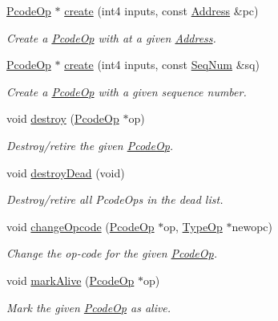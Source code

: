 \begin{DoxyCompactItemize}
\mbox{\hyperlink{class_pcode_op}{Pcode\+Op}} $\ast$ \mbox{\hyperlink{class_pcode_op_bank_a99a5d552174bddb89036c1755708b9aa}{create}} (int4 inputs, const \mbox{\hyperlink{class_address}{Address}} \&pc)
\begin{DoxyCompactList}\small\item\em Create a \mbox{\hyperlink{class_pcode_op}{Pcode\+Op}} with at a given \mbox{\hyperlink{class_address}{Address}}. \end{DoxyCompactList}\item 
\mbox{\hyperlink{class_pcode_op}{Pcode\+Op}} $\ast$ \mbox{\hyperlink{class_pcode_op_bank_a472c7fb8eea24665358e78977bc73245}{create}} (int4 inputs, const \mbox{\hyperlink{class_seq_num}{Seq\+Num}} \&sq)
\begin{DoxyCompactList}\small\item\em Create a \mbox{\hyperlink{class_pcode_op}{Pcode\+Op}} with a given sequence number. \end{DoxyCompactList}\item 
void \mbox{\hyperlink{class_pcode_op_bank_a1d447e7dcaeab2fd89e0a3dd8454b77d}{destroy}} (\mbox{\hyperlink{class_pcode_op}{Pcode\+Op}} $\ast$op)
\begin{DoxyCompactList}\small\item\em Destroy/retire the given \mbox{\hyperlink{class_pcode_op}{Pcode\+Op}}. \end{DoxyCompactList}\item 
void \mbox{\hyperlink{class_pcode_op_bank_aafab3087c0f8176d83088c66bc56f6b0}{destroy\+Dead}} (void)
\begin{DoxyCompactList}\small\item\em Destroy/retire all Pcode\+Ops in the {\itshape dead} list. \end{DoxyCompactList}\item 
void \mbox{\hyperlink{class_pcode_op_bank_a66328024453859527245d5143755adc6}{change\+Opcode}} (\mbox{\hyperlink{class_pcode_op}{Pcode\+Op}} $\ast$op, \mbox{\hyperlink{class_type_op}{Type\+Op}} $\ast$newopc)
\begin{DoxyCompactList}\small\item\em Change the op-\/code for the given \mbox{\hyperlink{class_pcode_op}{Pcode\+Op}}. \end{DoxyCompactList}\item 
void \mbox{\hyperlink{class_pcode_op_bank_ae9b41955863d0ff9deaabb27e02429be}{mark\+Alive}} (\mbox{\hyperlink{class_pcode_op}{Pcode\+Op}} $\ast$op)
\begin{DoxyCompactList}\small\item\em Mark the given \mbox{\hyperlink{class_pcode_op}{Pcode\+Op}} as {\itshape alive}. \end{DoxyCompactList}\item 

\end{DoxyCompactItemize}
